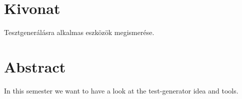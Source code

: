 \setcounter{page}{1}


\selecthungarian

\chapter*{Kivonat}

Tesztgenerálásra alkalmas eszközök megismerése.


\vfill
\selectenglish


\chapter*{Abstract}

In this semester we want to have a look at the test-generator idea and tools.


\vfill
\selectthesislanguage

\setcounter{romanPage}{\value{page}}
